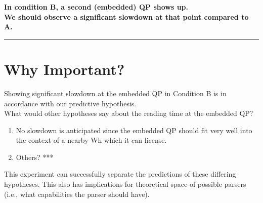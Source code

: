 \documentclass[12pt]{article}
\def\blank{\medskip\hrule\medskip}
\begin{document}

\begin{center}
\textbf{In condition B, a second (embedded) QP shows up. \\ We should observe a significant slowdown at that point compared to A.}
\end{center}


\blank

\section{Why Important?}
Showing significant slowdown at the embedded QP in Condition B is in accordance with our predictive hypothesis.\\

What would other hypotheses say about the reading time at the embedded QP?

\begin{enumerate}
    \item No slowdown is anticipated since the embedded QP should fit very well into the context of
    a nearby Wh which it can license.
    \item Others? ***
\end{enumerate}

This experiment can successfully separate the predictions of these differing hypotheses.
This also has implications for theoretical space of possible parsers (i.e., what capabilities the parser should have).
\end{document}

